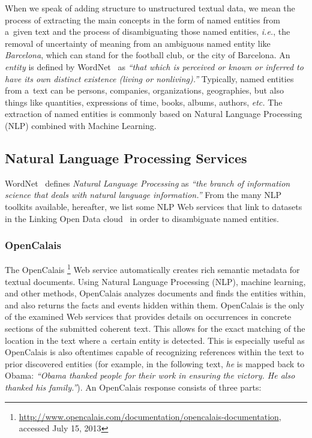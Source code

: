 When we speak of adding structure to unstructured textual data,
we mean the process of extracting the main concepts
in the form of named entities from a~given text
and the process of disambiguating those named entities,
\emph{i.e.}, the removal of uncertainty of meaning from
an ambiguous named entity like \emph{Barcelona},
which can stand for the football club, or the city of Barcelona.
An \emph{entity} is defined by
WordNet~\cite{miller1995wordnet,fellbaum1998wordnet}
as \textit{``that which is perceived or known or inferred
to have its own distinct existence (living or nonliving).''}
Typically, named entities from a~text can be persons, companies,
organizations, geographies, but also things like quantities,
expressions of time, books, albums, authors, \emph{etc.}
The extraction of named entities is commonly based on
Natural Language Processing (NLP) combined with Machine Learning.

\subsection{Natural Language Processing Services}
\label{sec:nlp-services}

WordNet~\cite{miller1995wordnet,fellbaum1998wordnet}
defines \emph{Natural Language Processing} as
\textit{``the branch of information science that deals with
natural language information.''}
From the many NLP toolkits available,
hereafter, we list some NLP Web services
that link to datasets in the
Linking Open Data
cloud~\cite{bizer2011statelodcloud,cyganiak2011lodcloud}
in order to disambiguate named entities.

\subsubsection{OpenCalais}\label{sec:opencalais}

The OpenCalais%
\footnote{\url{http://www.opencalais.com/documentation/opencalais-documentation},
accessed July 15, 2013}
Web service automatically creates rich semantic metadata
for textual documents.
Using Natural Language Processing (NLP),
machine learning, and other methods, OpenCalais analyzes documents
and finds the entities within, and also returns the facts and
events hidden within them.
OpenCalais is the only of the examined Web services
that provides details on occurrences in concrete sections
of the submitted coherent text.
This allows for the exact matching of the location in the text
where a~certain entity is detected.
This is especially useful as OpenCalais
is also oftentimes capable of recognizing references
within the text to prior discovered entities
(for example, in the following text,
\emph{he} is mapped back to Obama: \textit{``\emph{Obama}
thanked people for their work in ensuring the victory.
\emph{He} also thanked his family.''}).
An OpenCalais response consists of three parts:

